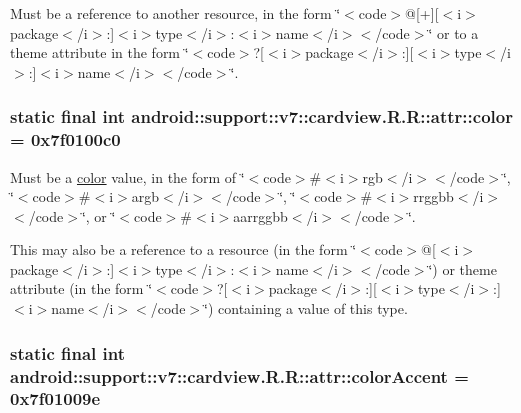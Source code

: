 Must be a reference to another resource, in the form \char`\"{}$<$code$>$@\mbox{[}+\mbox{]}\mbox{[}$<$i$>$package$<$/i$>$:\mbox{]}$<$i$>$type$<$/i$>$:$<$i$>$name$<$/i$>$$<$/code$>$\char`\"{} or to a theme attribute in the form \char`\"{}$<$code$>$?\mbox{[}$<$i$>$package$<$/i$>$:\mbox{]}\mbox{[}$<$i$>$type$<$/i$>$:\mbox{]}$<$i$>$name$<$/i$>$$<$/code$>$\char`\"{}. \hypertarget{classandroid_1_1support_1_1v7_1_1cardview_1_1_r_1_1attr_0039a2c5c5dc619d894dddb72f1d2fc2}{
\subsubsection[{color}]{\setlength{\rightskip}{0pt plus 5cm}static final int android::support::v7::cardview.R.R::attr::color = 0x7f0100c0}}
\label{classandroid_1_1support_1_1v7_1_1cardview_1_1_r_1_1attr_0039a2c5c5dc619d894dddb72f1d2fc2}


Must be a \hyperlink{classandroid_1_1support_1_1v7_1_1cardview_1_1_r_1_1color}{color} value, in the form of \char`\"{}$<$code$>$\#$<$i$>$rgb$<$/i$>$$<$/code$>$\char`\"{}, \char`\"{}$<$code$>$\#$<$i$>$argb$<$/i$>$$<$/code$>$\char`\"{}, \char`\"{}$<$code$>$\#$<$i$>$rrggbb$<$/i$>$$<$/code$>$\char`\"{}, or \char`\"{}$<$code$>$\#$<$i$>$aarrggbb$<$/i$>$$<$/code$>$\char`\"{}. 

This may also be a reference to a resource (in the form \char`\"{}$<$code$>$@\mbox{[}$<$i$>$package$<$/i$>$:\mbox{]}$<$i$>$type$<$/i$>$:$<$i$>$name$<$/i$>$$<$/code$>$\char`\"{}) or theme attribute (in the form \char`\"{}$<$code$>$?\mbox{[}$<$i$>$package$<$/i$>$:\mbox{]}\mbox{[}$<$i$>$type$<$/i$>$:\mbox{]}$<$i$>$name$<$/i$>$$<$/code$>$\char`\"{}) containing a value of this type. \hypertarget{classandroid_1_1support_1_1v7_1_1cardview_1_1_r_1_1attr_ced545cf60fb56f4321d795748e996d9}{
\subsubsection[{colorAccent}]{\setlength{\rightskip}{0pt plus 5cm}static final int android::support::v7::cardview.R.R::attr::colorAccent = 0x7f01009e}}
\label{classandroid_1_1support_1_1v7_1_1cardview_1_1_r_1_1attr_ced545cf60fb56f4321d795748e996d9}


